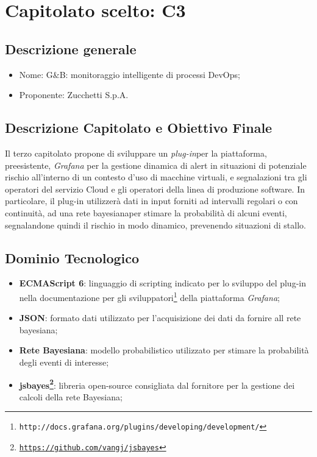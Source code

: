 \section{Capitolato scelto: C3}

\subsection{Descrizione generale}
\begin{itemize}
	\item Nome: G$\&$B: monitoraggio intelligente di processi DevOps;
	\item Proponente: Zucchetti S.p.A.
\end{itemize}

\subsection{Descrizione Capitolato e Obiettivo Finale}
Il terzo capitolato propone di sviluppare un \textit{plug-in}\glossario per la piattaforma, preesistente, \textit{Grafana} per la gestione dinamica di alert in situazioni di potenziale rischio all'interno di un contesto d'uso di macchine virtuali, e segnalazioni tra gli operatori del servizio Cloud e gli operatori della linea di produzione software.
In particolare, il plug-in  utilizzerà dati in input forniti ad intervalli regolari o con continuità, ad una rete bayesiana\glossario per stimare la probabilità di alcuni eventi, segnalandone quindi il rischio in modo dinamico, prevenendo situazioni di stallo.

\subsection{Dominio Tecnologico}
\begin{itemize}
	\item \textbf{ECMAScript 6\glossario}: linguaggio di scripting indicato per lo sviluppo del plug-in nella documentazione per gli sviluppatori\footnote{\texttt{http://docs.grafana.org/plugins/developing/development/}} della piattaforma \textit{Grafana};
	\item \textbf{JSON}: formato dati utilizzato per l'acquisizione dei dati da fornire all rete bayesiana;
	\item \textbf{Rete Bayesiana}: modello probabilistico utilizzato per stimare la probabilità degli eventi di interesse;
	\item \textbf{jsbayes\footnote{\hyperref[Link al repository GitHub]{\texttt{https://github.com/vangj/jsbayes}}}}: libreria open-source consigliata dal fornitore per la gestione dei calcoli della rete Bayesiana;
\end{itemize}

